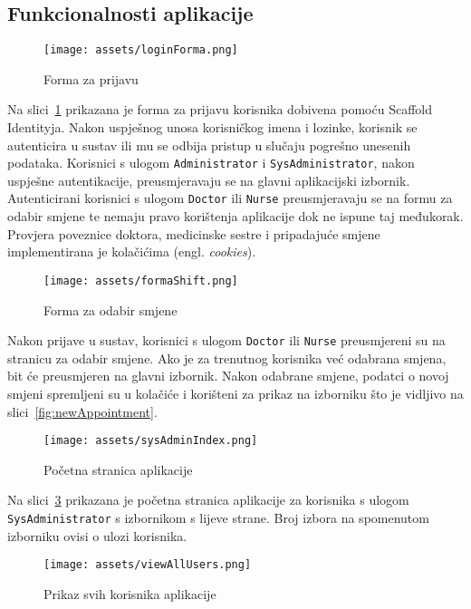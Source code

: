\subsection{Funkcionalnosti aplikacije}

\begin{figure}[H]
	\texttt{[image: assets/loginForma.png]}
	\centering
	\caption{Forma za prijavu}
	\label{fig:loginForm}
\end{figure}

Na slici~\ref{fig:loginForm} prikazana je forma za prijavu korisnika dobivena pomoću Scaffold Identityja. Nakon uspješnog unosa korisničkog imena i lozinke, korisnik se autenticira u sustav ili mu se odbija pristup u slučaju pogrešno unesenih podataka. Korisnici s ulogom \texttt{Administrator} i \texttt{SysAdministrator}, nakon uspješne autentikacije, preusmjeravaju se na glavni aplikacijski izbornik. Autenticirani korisnici s ulogom \texttt{Doctor} ili \texttt{Nurse} preusmjeravaju se na formu za odabir smjene te nemaju pravo korištenja aplikacije dok ne ispune taj međukorak. Provjera poveznice doktora, medicinske sestre i pripadajuće smjene implementirana je kolačićima (engl. \textit{cookies}).

\begin{figure}[H]
	\texttt{[image: assets/formaShift.png]}
	\centering
	\caption{Forma za odabir smjene}
	\label{fig:shiftForm}
\end{figure}

Nakon prijave u sustav, korisnici s ulogom \texttt{Doctor} ili \texttt{Nurse} preusmjereni su na stranicu za odabir smjene. Ako je za trenutnog korisnika već odabrana smjena, bit će preusmjeren na glavni izbornik. Nakon odabrane smjene, podatci o novoj smjeni spremljeni su u kolačiće i korišteni za prikaz na izborniku što je vidljivo na slici~\ref{fig:newAppointment}.

\begin{figure}[H]
	\texttt{[image: assets/sysAdminIndex.png]}
	\centering
	\caption{Početna stranica aplikacije}
	\label{fig:homePage}
\end{figure}

Na slici~\ref{fig:homePage} prikazana je početna stranica aplikacije za korisnika s ulogom \\\texttt{SysAdministrator} s izbornikom s lijeve strane. Broj izbora na spomenutom izborniku ovisi o ulozi korisnika.

\begin{figure}[H]
	\texttt{[image: assets/viewAllUsers.png]}
	\centering
	\caption{Prikaz svih korisnika aplikacije}
	\label{fig:allUsers}
\end{figure}

